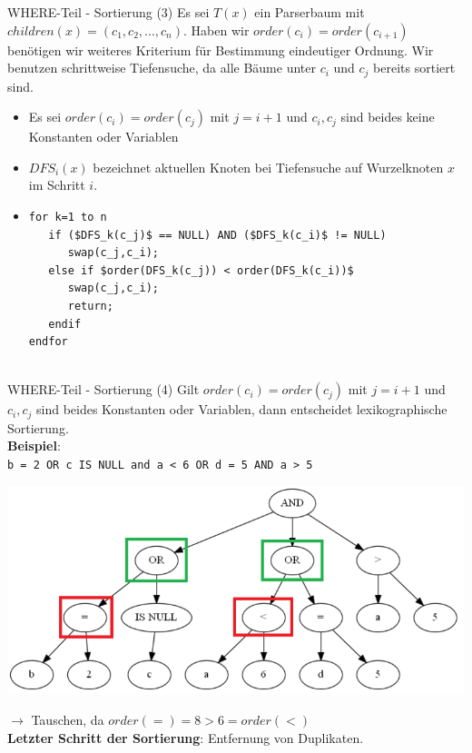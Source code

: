 \documentclass{beamer}
\begin{document}
\begin{frame}[fragile]{WHERE-Teil - Sortierung (3)}
Es sei $T(x)$ ein Parserbaum mit $children(x) = (c_1,c_2,...,c_n)$. Haben wir $order(c_i) = order(c_{i+1})$ benötigen wir weiteres Kriterium für Bestimmung eindeutiger Ordnung.
Wir benutzen schrittweise Tiefensuche, da alle Bäume unter $c_i$ und $c_j$ bereits sortiert sind.
\begin{itemize}
\item Es sei $order(c_i) = order(c_j)$ mit $j = i + 1$ und $c_i,c_j$ sind beides keine Konstanten oder Variablen
\item $DFS_i(x)$ bezeichnet aktuellen Knoten bei Tiefensuche auf Wurzelknoten $x$ im Schritt $i$.
\item \begin{lstlisting}[mathescape]
for k=1 to n
   if ($DFS_k(c_j)$ == NULL) AND ($DFS_k(c_i)$ != NULL)
   	  swap(c_j,c_i);
   else if $order(DFS_k(c_j)) < order(DFS_k(c_i))$
      swap(c_j,c_i);
      return;
   endif
endfor
   
\end{lstlisting}
\end{itemize}
\end{frame}


\begin{frame}[fragile]{WHERE-Teil - Sortierung (4)}
Gilt $order(c_i) = order(c_j)$ mit $j = i + 1$ und $c_i,c_j$ sind beides Konstanten oder Variablen, dann entscheidet lexikographische Sortierung.\\
\vspace{5mm}
\textbf{Beispiel}:\\

\verb|b = 2 OR c IS NULL and a < 6 OR d = 5 AND a > 5|
\begin{center}
\includegraphics[scale=0.27]{sort_step2.png}
\end{center}

$\to$ Tauschen, da $order(=) = 8 > 6 = order(<) $\\
\textbf{Letzter Schritt der Sortierung}: Entfernung von Duplikaten.
\end{frame}
\end{document}
